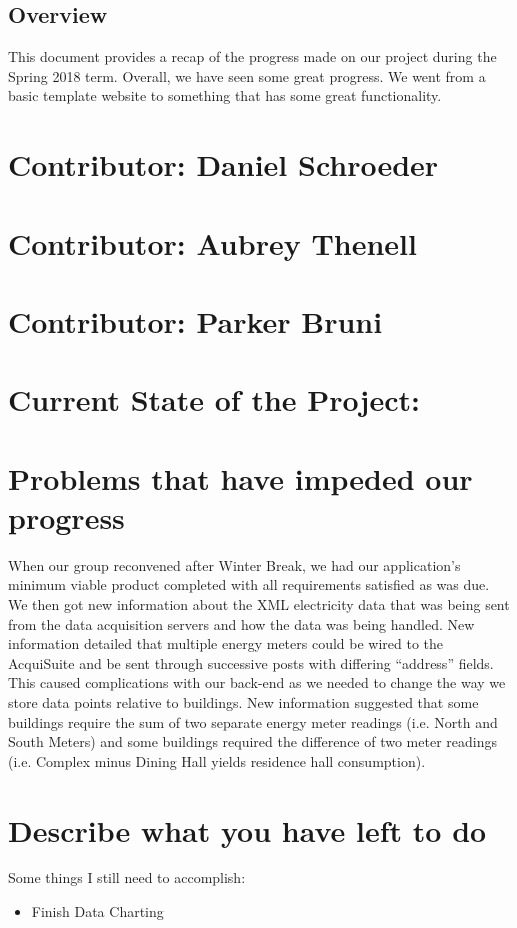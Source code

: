 \documentclass[letterpaper,10pt,serif,draftclsnofoot,onecolumn,compsoc,titlepage]{IEEEtran}
\begin{document}
\subsection{Overview}
This document provides a recap of the progress made on our project during the Spring 2018 term. Overall, we have seen some great progress. We went from a basic template website to something that has some great functionality. \\ 
\section{Contributor: Daniel Schroeder} 

\section{Contributor: Aubrey Thenell}

\section{Contributor: Parker Bruni}

\section{Current State of the Project:} 

\section{Problems that have impeded our progress}
When our group reconvened after Winter Break, we had our application's minimum viable product completed with all requirements satisfied as was due. We then got new information about the XML electricity data that was being sent from the data acquisition servers and how the data was being handled. New information detailed that multiple energy meters could be wired to the AcquiSuite and be sent through successive posts with differing ``address'' fields. This caused complications with our back-end as we needed to change the way we store data points relative to buildings. New information suggested that some buildings require the sum of two separate energy meter readings (i.e. North and South Meters) and some buildings required the difference of two meter readings (i.e. Complex minus Dining Hall yields residence hall consumption).
\section{Describe what you have left to do}
    Some things I still need to accomplish:
    \begin{itemize}
      \item Finish Data Charting
    \end{itemize}
\newpage
\cite{mongoose}


\end{document}
